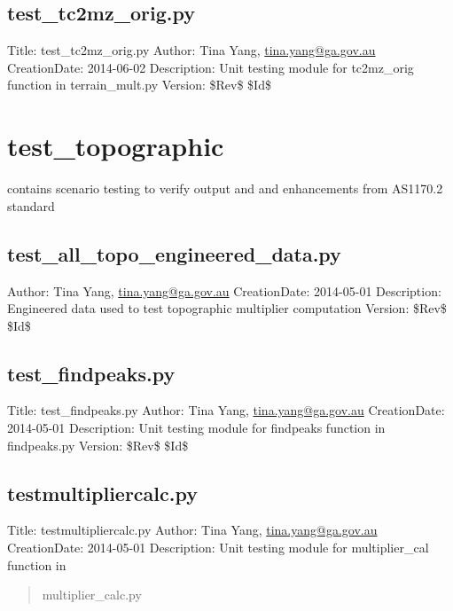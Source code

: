 \documentclass[letterpaper,10pt,english]{sphinxmanual}
\begin{document}
\subsection{test\_tc2mz\_orig.py}
\label{docs/tests:module-test_tc2mz_orig}\label{docs/tests:test-tc2mz-orig-py}
Title: test\_tc2mz\_orig.py 
Author: Tina Yang, \href{mailto:tina.yang@ga.gov.au}{tina.yang@ga.gov.au} 
CreationDate: 2014-06-02
Description: Unit testing module for tc2mz\_orig function in terrain\_mult.py 
Version: \$Rev\$ 
\$Id\$


\section{test\_topographic}
\label{docs/tests:test-topographic}
contains scenario testing to verify output and and enhancements from AS1170.2 standard


\subsection{test\_all\_topo\_engineered\_data.py}
\label{docs/tests:module-test_topographic.test_all_topo_engineered_data}\label{docs/tests:test-all-topo-engineered-data-py}
Author: Tina Yang, \href{mailto:tina.yang@ga.gov.au}{tina.yang@ga.gov.au} 
CreationDate: 2014-05-01
Description: Engineered data used to test topographic multiplier computation 
Version: \$Rev\$ 
\$Id\$


\subsection{test\_findpeaks.py}
\label{docs/tests:test-findpeaks-py}\label{docs/tests:module-test_topographic.test_findpeaks}
Title: test\_findpeaks.py 
Author: Tina Yang, \href{mailto:tina.yang@ga.gov.au}{tina.yang@ga.gov.au} 
CreationDate: 2014-05-01
Description: Unit testing module for findpeaks function in findpeaks.py 
Version: \$Rev\$ 
\$Id\$


\subsection{testmultipliercalc.py}
\label{docs/tests:module-test_topographic.testmultipliercalc}\label{docs/tests:testmultipliercalc-py}
Title: testmultipliercalc.py 
Author: Tina Yang, \href{mailto:tina.yang@ga.gov.au}{tina.yang@ga.gov.au} 
CreationDate: 2014-05-01
Description: Unit testing module for multiplier\_cal function in
\begin{quote}

multiplier\_calc.py
\end{quote}
\end{document}
